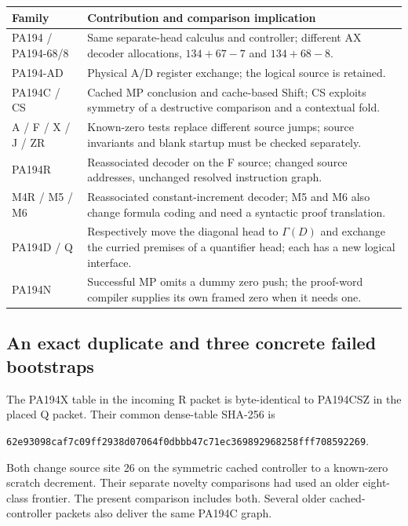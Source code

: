 \documentclass[10pt,letterpaper]{article}
\newcommand{\file}[1]{\nolinkurl{#1}}
\begin{document}
\begin{center}\small
\begin{tabularx}{\linewidth}{@{}lX@{}}\toprule
Family & Contribution and comparison implication\\\midrule
PA194 / PA194-68/8 & Same separate-head calculus and controller; different
AX decoder allocations, $134+67-7$ and $134+68-8$.\\
PA194-AD & Physical A/D register exchange; the logical source is retained.\\
PA194C / CS & Cached MP conclusion and cache-based Shift; CS exploits
symmetry of a destructive comparison and a contextual fold.\\
A / F / X / J / ZR & Known-zero tests replace different source jumps;
source invariants and blank startup must be checked separately.\\
PA194R & Reassociated decoder on the F source; changed source addresses,
unchanged resolved instruction graph.\\
M4R / M5 / M6 & Reassociated constant-increment decoder; M5 and M6 also
change formula coding and need a syntactic proof translation.\\
PA194D / Q & Respectively move the diagonal head to $\Gamma(D)$ and exchange
the curried premises of a quantifier head; each has a new logical interface.\\
PA194N & Successful MP omits a dummy zero push; the proof-word compiler
supplies its own framed zero when it needs one.\\\bottomrule
\end{tabularx}
\end{center}

\subsection{An exact duplicate and three concrete failed bootstraps}

The PA194X table in the incoming R packet is byte-identical to PA194CSZ
in the placed Q packet. Their common dense-table SHA-256 is
\begin{center}\small
\file{62e93098caf7c09ff2938d07064f0dbbb47c71ec369892968258fff708592269}.
\end{center}
Both change source site 26 on the symmetric cached controller to a
known-zero scratch decrement. Their separate novelty comparisons had used
an older eight-class frontier. The present comparison includes both.
Several older cached-controller packets also deliver the same PA194C graph.
\end{document}
